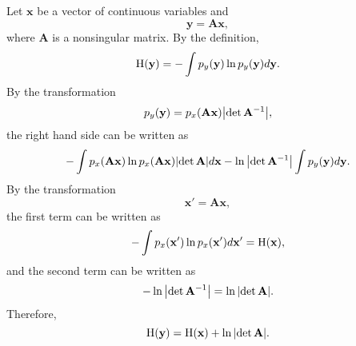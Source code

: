 \subsection{}
Let $\mathbf{x}$ be a vector of continuous variables and 
%
\begin{equation}
\mathbf{y} = \mathbf{A} \mathbf{x},
\end{equation}
%
where $\mathbf{A}$ is a nonsingular matrix.
By the definition, 
%
\begin{equation}
{\rm H}(\mathbf{y}) = - \int p_y(\mathbf{y}) \ln p_y(\mathbf{y}) d\mathbf{y}.
\end{equation}
%
By the transformation
%
\begin{equation}
p_y(\mathbf{y}) = p_x(\mathbf{A} \mathbf{x}) \abs{\det \mathbf{A} ^ {-1}},
\end{equation}
%
the right hand side can be written as
%
\begin{equation}
- \int p_x(\mathbf{A} \mathbf{x}) \ln p_x(\mathbf{A} \mathbf{x}) \abs{\det \mathbf{A}} d\mathbf{x} - \ln \abs{\det \mathbf{A} ^ {-1}} \int p_y(\mathbf{y}) d\mathbf{y}.
\end{equation}
%
By the transformation 
%
\begin{equation}
\mathbf{x}' = \mathbf{A} \mathbf{x},
\end{equation}
%
the first term can be written as
%
\begin{equation}
- \int p_x(\mathbf{x}') \ln p_x(\mathbf{x}') d\mathbf{x}' = {\rm H}(\mathbf{x}),
\end{equation}
%
and the second term can be written as
%
\begin{equation}
- \ln \abs{\det \mathbf{A} ^ {-1}} = \ln \abs{\det \mathbf{A}}.
\end{equation}
%
Therefore,
%
\begin{equation}
{\rm H}(\mathbf{y}) = {\rm H}(\mathbf{x}) + \ln \abs{\det \mathbf{A}}.
\end{equation}
%

